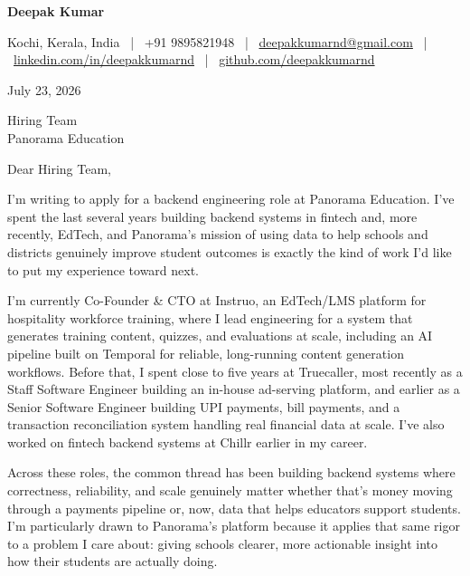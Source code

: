 \documentclass[11pt,a4paper]{article}
\begin{document}
{\Large\bfseries\color{navy} Deepak Kumar}\par
\vspace{2pt}
{\small\color{graytext}
Kochi, Kerala, India \ | \ +91 9895821948 \ | \
\href{mailto:deepakkumarnd@gmail.com}{deepakkumarnd@gmail.com} \ | \
\href{https://linkedin.com/in/deepakkumarnd}{linkedin.com/in/deepakkumarnd} \ | \
\href{https://github.com/deepakkumarnd}{github.com/deepakkumarnd}
}\par
\vspace{18pt}

{\color{darktext} July 23, 2026}\par
\vspace{12pt}

{\color{darktext}
Hiring Team \\
Panorama Education
}\par
\vspace{18pt}

{\color{darktext} Dear Hiring Team,}\par
\vspace{10pt}

{\color{darktext}
I'm writing to apply for a backend engineering role at Panorama Education. I've spent the last several
years building backend systems in fintech and, more recently, EdTech, and Panorama's mission of using
data to help schools and districts genuinely improve student outcomes is exactly the kind of work I'd like
to put my experience toward next.
}\par
\vspace{10pt}

{\color{darktext}
I'm currently Co-Founder \& CTO at Instruo, an EdTech/LMS platform for hospitality workforce training,
where I lead engineering for a system that generates training content, quizzes, and evaluations at scale,
including an AI pipeline built on Temporal for reliable, long-running content generation workflows.
Before that, I spent close to five years at Truecaller, most recently as a Staff Software Engineer building
an in-house ad-serving platform, and earlier as a Senior Software Engineer building UPI payments, bill
payments, and a transaction reconciliation system handling real financial data at scale. I've also worked
on fintech backend systems at Chillr earlier in my career.
}\par
\vspace{10pt}

{\color{darktext}
Across these roles, the common thread has been building backend systems where correctness, reliability,
and scale genuinely matter whether that's money moving through a payments pipeline or, now, data
that helps educators support students. I'm particularly drawn to Panorama's platform because it applies
that same rigor to a problem I care about: giving schools clearer, more actionable insight into how their
students are actually doing.
}\par
\vspace{10pt}
\end{document}
